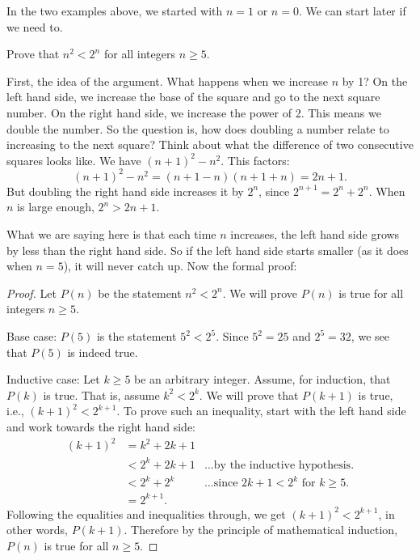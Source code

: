\documentclass[12pt]{article}
\begin{document}
In the two examples above, we started with $n = 1$ or $n = 0$.  We can start later if we need to.

\begin{example}
  Prove that $n^2 < 2^n$ for all integers $n \ge 5$.
  \begin{solution}
  	First, the idea of the argument.  What happens when we increase $n$ by 1?  On the left hand side, we increase the base of the square and go to the next square number.  On the right hand side, we increase the power of 2.  This means we double the number.  So the question is, how does doubling a number relate to increasing to the next square?  Think about what the difference of two consecutive squares looks like.  We have $(n+1)^2 - n^2$.  This factors: \[(n+1)^2 - n^2 = (n+1-n)(n+1+n) = 2n+1.\]
    But doubling the right hand side increases it by $2^n$, since $2^{n+1} = 2^n + 2^n$.  When $n$ is large enough, $2^n > 2n + 1$.  
  	
  	What we are saying here is that each time $n$ increases, the left hand side grows by less than the right hand side.  So if the left hand side starts smaller (as it does when $n = 5$), it will never catch up.  Now the formal proof:
  
  \begin{proof}
    Let $P(n)$ be the statement $n^2 < 2^n$.
    We will prove $P(n)$ is true for all integers $n \ge 5$.
    
    Base case: $P(5)$ is the statement $5^2 < 2^5$.  Since $5^2 = 25$ and $2^5 = 32$, we see that $P(5)$ is indeed true.
    
    Inductive case: Let $k \ge 5$ be an arbitrary integer.  Assume, for induction, that $P(k)$ is true.  That is, assume $k^2 < 2^k$.  We will prove that $P(k+1)$ is true, i.e., $(k+1)^2 < 2^{k+1}$.  To prove such an inequality, start with the left hand side and work towards the right hand side:
    \begin{align*}
      (k+1)^2 & = k^2 + 2k + 1 &\\
       & < 2^k + 2k + 1 &\mbox{\ldots by the inductive hypothesis.}\\
       & < 2^k + 2^k  &\mbox{\ldots since $2k + 1 < 2^k$ for $k \ge 5$.}\\
       & = 2^{k+1}. &
    \end{align*}
    Following the equalities and inequalities through, we get $(k+1)^2 < 2^{k+1}$, in other words, $P(k+1)$.  Therefore by the principle of mathematical induction, $P(n)$ is true for all $n \ge 5$.
  \end{proof}
	\end{solution}
\end{example}
\end{document}
